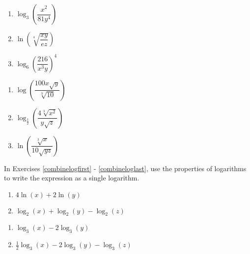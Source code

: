 \documentclass{ximera}
\begin{document}
\begin{multicols}{3}
\begin{enumerate}
\setcounter{enumi}{\value{HW}}

\item $\log_{3} \left(\dfrac{x^2}{81y^4}\right)$
\item $\ln\left(\sqrt[4]{\dfrac{xy}{ez}}\right)$
\item $\log_{6} \left(\dfrac{216}{x^3y}\right)^4$

\setcounter{HW}{\value{enumi}}
\end{enumerate}
\end{multicols}

\begin{multicols}{3}
\begin{enumerate}
\setcounter{enumi}{\value{HW}}

\item $\log\left(\dfrac{100x\sqrt{y}}{\sqrt[3]{10}}\right)$ 
\item $\log_{\frac{1}{2}}\left(\dfrac{4\sqrt[3]{x^2}}{y\sqrt{z}}\right)$
\item $\ln \left(\dfrac{\sqrt[3]{x}}{10 \sqrt{yz}}\right)$  \label{expandloglast}

\setcounter{HW}{\value{enumi}}
\end{enumerate}
\end{multicols}

In Exercises \ref{combinelogfirst} - \ref{combineloglast}, use the properties of logarithms to write the expression as a single logarithm.

\begin{multicols}{2}
\begin{enumerate}
\setcounter{enumi}{\value{HW}}

\item $4\ln(x) + 2\ln(y)$ \label{combinelogfirst}
\item $\log_{2}(x) + \log_{2}(y) - \log_{2}(z)$

\setcounter{HW}{\value{enumi}}
\end{enumerate}
\end{multicols}

\begin{multicols}{2}
\begin{enumerate}
\setcounter{enumi}{\value{HW}}

\item $\log_{3}(x) - 2 \log_{3}(y)$
\item $\frac{1}{2}\log_{3}(x) - 2\log_{3}(y) - \log_{3}(z)$

\setcounter{HW}{\value{enumi}}
\end{enumerate}
\end{multicols}
\end{document}
